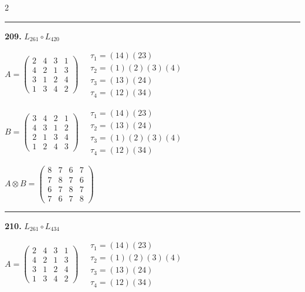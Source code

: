 \begin{multicols}{2}
\vspace{0.3em}
\hrule
\vspace{0.3em}

\noindent\textbf{209.} $L_{261} \circ L_{420}$

$A = \begin{pmatrix} 2 & 4 & 3 & 1 \\ 4 & 2 & 1 & 3 \\ 3 & 1 & 2 & 4 \\ 1 & 3 & 4 & 2 \end{pmatrix} \quad \begin{matrix} \tau_{1}=(1 4)(2 3) \\ \tau_{2}=(1)(2)(3)(4) \\ \tau_{3}=(1 3)(2 4) \\ \tau_{4}=(1 2)(3 4) \end{matrix}$

$B = \begin{pmatrix} 3 & 4 & 2 & 1 \\ 4 & 3 & 1 & 2 \\ 2 & 1 & 3 & 4 \\ 1 & 2 & 4 & 3 \end{pmatrix} \quad \begin{matrix} \tau_{1}=(1 4)(2 3) \\ \tau_{2}=(1 3)(2 4) \\ \tau_{3}=(1)(2)(3)(4) \\ \tau_{4}=(1 2)(3 4) \end{matrix}$

$A \otimes B = \begin{pmatrix} 8 & 7 & 6 & 7 \\ 7 & 8 & 7 & 6 \\ 6 & 7 & 8 & 7 \\ 7 & 6 & 7 & 8 \end{pmatrix}$

\vspace{0.3em}
\hrule
\vspace{0.3em}

\noindent\textbf{210.} $L_{261} \circ L_{434}$

$A = \begin{pmatrix} 2 & 4 & 3 & 1 \\ 4 & 2 & 1 & 3 \\ 3 & 1 & 2 & 4 \\ 1 & 3 & 4 & 2 \end{pmatrix} \quad \begin{matrix} \tau_{1}=(1 4)(2 3) \\ \tau_{2}=(1)(2)(3)(4) \\ \tau_{3}=(1 3)(2 4) \\ \tau_{4}=(1 2)(3 4) \end{matrix}$


\end{multicols}
